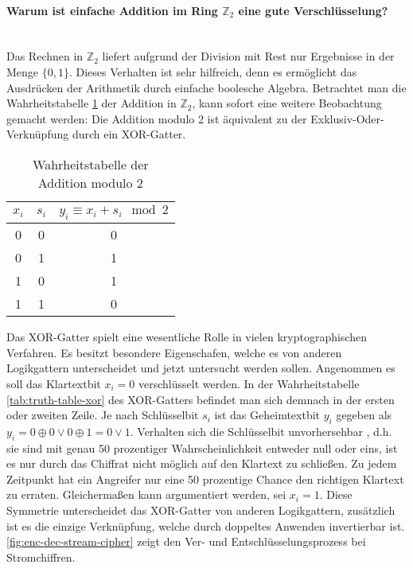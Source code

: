 \paragraph{Warum ist einfache Addition im Ring $\mathbb{Z}_2$ eine gute Verschlüsselung?}\mbox{}\\
Das Rechnen in $\mathbb{Z}_2$ liefert aufgrund der Division mit Rest nur Ergebnisse in
der Menge $\{0,1\}$. Dieses Verhalten ist sehr hilfreich, denn es ermöglicht das Ausdrücken der
Arithmetik durch einfache boolesche Algebra.
Betrachtet man die Wahrheitstabelle \ref{tab:truth-table-addition-mod-2}
der Addition in $\mathbb{Z}_2$, kann sofort eine weitere Beobachtung gemacht werden:
Die Addition modulo 2 ist äquivalent zu der Exklusiv-Oder-Verknüpfung durch ein XOR-Gatter.

\begin{table}[h]
  \centering
  \caption{Wahrheitstabelle der Addition modulo 2}
  \begin{tabular}{cc|c}
    $x_i$ & $s_i$ & $y_i \equiv x_i + s_i \mod{2}$ \\ \hline
    0     & 0     & 0                              \\
    0     & 1     & 1                              \\
    1     & 0     & 1                              \\
    1     & 1     & 0                              \\
  \end{tabular}
  \label{tab:truth-table-addition-mod-2}
\end{table}

\noindent
Das XOR-Gatter spielt eine wesentliche Rolle in vielen kryptographischen Verfahren.
Es besitzt besondere Eigenschafen, welche es von anderen Logikgattern
unterscheidet und jetzt untersucht werden sollen.
Angenommen es soll das Klartextbit $x_i = 0$ verschlüsselt werden. In der Wahrheitstabelle
\ref{tab:truth-table-xor} des XOR-Gatters befindet
man sich demnach in der ersten oder zweiten Zeile.
Je nach Schlüsselbit $s_i$ ist das Geheimtextbit $y_i$ gegeben als
$y_i = 0 \oplus 0 \vee 0 \oplus 1 = 0 \vee 1$.
Verhalten sich die Schlüsselbit unvorhersehbar , d.h. sie sind mit genau 50 prozentiger
Wahrscheinlichkeit entweder null oder eins, ist es nur durch das Chiffrat nicht möglich auf
den Klartext zu schließen. Zu jedem Zeitpunkt hat ein Angreifer nur eine
50 prozentige Chance den richtigen Klartext zu erraten.
Gleichermaßen kann argumentiert werden, sei $x_i = 1$.
Diese Symmetrie unterscheidet das XOR-Gatter von anderen Logikgattern, zusätzlich ist es die einzige
Verknüpfung, welche durch doppeltes Anwenden invertierbar ist.
\autoref{fig:enc-dec-stream-cipher} zeigt den Ver- und Entschlüsselungsprozess
bei Stromchiffren.


